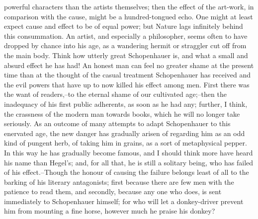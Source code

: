 powerful characters than the artists themselves; then the effect of
the art-work, in comparison with the cause, might be a hundred-tongued
echo. One might at least expect cause and effect to be of equal power;
but Nature lags infinitely behind this consummation. An artist, and
especially a philosopher, seems often to have dropped by chance into his
age, as a wandering hermit or straggler cut off from the main body.
Think how utterly great Schopenhauer is, and what a small and absurd
effect he has had! An honest man can feel no greater shame at the
present time than at the thought of the casual treatment Schopenhauer
has received and the evil powers that have up to now killed his effect
among men. First there was the want of readers,--to the eternal shame of
our cultivated age;--then the inadequacy of his first public adherents,
as soon as he had any; further, I think, the crassness of the modern man
towards books, which he will no longer take seriously. As an outcome of
many attempts to adapt Schopenhauer to this enervated age, the new
danger has gradually arisen of regarding him as an odd kind of pungent
herb, of taking him in grains, as a sort of metaphysical pepper. In this
way he has gradually become famous, and I should think more have heard
his name than Hegel's; and, for all that, he is still a solitary being,
who has failed of his effect.--Though the honour of causing the failure
belongs least of all to the barking of his literary antagonists; first
because there are few men with the patience to read them, and secondly,
because any one who does, is sent immediately to Schopenhauer himself;
for who will let a donkey-driver prevent him from mounting a fine horse,
however much he praise his donkey?

